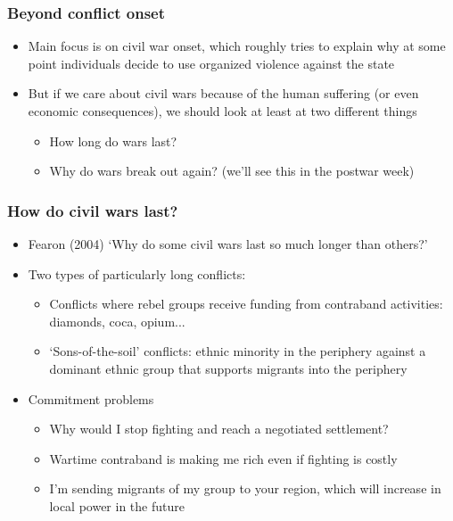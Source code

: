 \documentclass[aspectratio=43]{beamer}
\begin{document}
\begin{frame}
\frametitle{Beyond conflict onset}
\centering

\begin{itemize}
  \item Main focus is on civil war onset, which roughly tries to explain why at some point individuals decide to use organized violence against the state
  \item But if we care about civil wars because of the human suffering (or even economic consequences), we should look at least at two different things
  \begin{itemize}
    \item How long do wars last?
    \item Why do wars break out again? (we'll see this in the postwar week)
  \end{itemize}
\end{itemize}

\end{frame}



\begin{frame}
\frametitle{How  do civil wars last?}
\centering

\begin{itemize}
  \item Fearon (2004) `Why do some civil wars last so much longer than others?'
  \item Two types of particularly long conflicts:
  \begin{itemize}
    \item Conflicts where rebel groups receive funding from contraband activities: diamonds, coca, opium...
    \item `Sons-of-the-soil' conflicts: ethnic minority in the periphery against a dominant ethnic group that supports migrants into the periphery
  \end{itemize}
  \item Commitment problems
  \begin{itemize}
    \item Why would I stop fighting and reach a negotiated settlement?
    \item Wartime contraband is making me rich even if fighting is costly
    \item I'm sending migrants of my group to your region, which will increase in local power in the future
  \end{itemize}
\end{itemize}

\end{frame}
\end{document}
